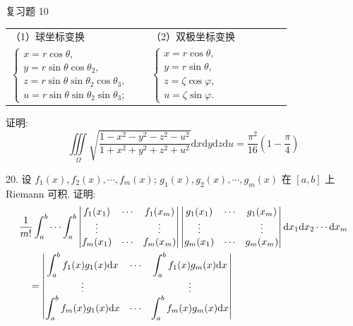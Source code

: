 \begin{exblock}{复习题 10}
\begin{tabular}{@{}p{0.46\linewidth}p{0.46\linewidth}@{}}
（1）球坐标变换 & （2）双极坐标变换 \\[2pt]
$\displaystyle \begin{cases}
x = r\cos\theta,\\
y = r\sin\theta\cos\theta_{2},\\
z = r\sin\theta\sin\theta_{2}\cos\theta_{3},\\
u = r\sin\theta\sin\theta_{2}\sin\theta_{3};
\end{cases}$
&
$\displaystyle \begin{cases}
x = r\cos\theta,\\
y = r\sin\theta,\\
z = \zeta\cos\varphi,\\
u = \zeta\sin\varphi.
\end{cases}$
\end{tabular}

证明:
\[
\iiint\limits_{\Omega}
\sqrt{\frac{1-x^{2}-y^{2}-z^{2}-u^{2}}{1+x^{2}+y^{2}+z^{2}+u^{2}}}
\mathrm{d}x\mathrm{d}y\mathrm{d}z\mathrm{d}u
= \frac{\pi^{2}}{16} \left( 1 - \frac{\pi}{4} \right)
\]

20. 设 $f_{1}(x), f_{2}(x), \cdots, f_{m}(x)$;
$g_{1}(x), g_{2}(x), \cdots, g_{m}(x)$ 在 $[a,b]$ 上 Riemann 可积. 证明:
\[
\begin{aligned}
&\frac{1}{m!} \int_{a}^{b} \cdots \int_{a}^{b}
\left| \begin{matrix}
f_{1}(x_{1}) & \cdots & f_{1}(x_{m})\\ \vdots & & \vdots\\ f_{m}(x_{1}) & \cdots & f_{m}(x_{m})
\end{matrix} \right|
\left| \begin{matrix}
g_{1}(x_{1}) & \cdots & g_{1}(x_{m})\\ \vdots & & \vdots\\ g_{m}(x_{1}) & \cdots & g_{m}(x_{m})
\end{matrix} \right|
\mathrm{d}x_{1} \mathrm{d}x_{2} \cdots \mathrm{d}x_{m} \notag\\
&\quad= \left| \begin{matrix}
\displaystyle\int_{a}^{b} f_{1}(x) g_{1}(x) \mathrm{d}x & \cdots &
\displaystyle\int_{a}^{b} f_{1}(x) g_{m}(x) \mathrm{d}x\\ \vdots & & \vdots\\
\displaystyle\int_{a}^{b} f_{m}(x) g_{1}(x) \mathrm{d}x & \cdots &
\displaystyle\int_{a}^{b} f_{m}(x) g_{m}(x) \mathrm{d}x
\end{matrix} \right| \notag
\end{aligned}
\]

\end{exblock}

